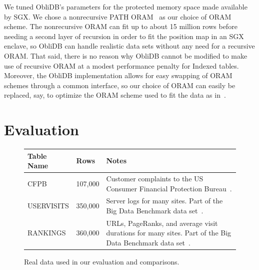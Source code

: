 \documentclass[letterpaper,twocolumn,10pt]{article}
\def\name/{ObliDB}
\begin{document}
We tuned ObliDB's parameters for the protected memory space made available by SGX. We chose a nonrecursive PATH ORAM~\cite{SDS+13} as our choice of ORAM scheme. The nonrecursive ORAM can fit up to about 15 million rows before needing a second layer of recursion in order to fit the position map in an SGX enclave, so \name/ can handle realistic data sets without any need for a recursive ORAM. That said, there is no reason why \name/ cannot be modified to make use of recursive ORAM at a modest performance penalty for Indexed tables. Moreover, the \name/ implementation allows for easy swapping of ORAM schemes through a common interface, so our choice of ORAM can easily be replaced, say, to optimize the ORAM scheme used to fit the data as in~\cite{ZWR+16}.

\section{Evaluation}\label{eval}
\begin{figure}
\small
\centering
\begin{tabular}{llp{3.5cm}}
\textbf{Table Name} & \textbf{Rows} & \textbf{Notes} \\\hline\rule{0pt}{2ex}
CFPB & 107,000 & Customer complaints to the US Consumer Financial Protection Bureau~\cite{CFPB}.\\
USERVISITS & 350,000 & Server logs for many sites. Part of the Big Data Benchmark data set~\cite{BDB}.\\
RANKINGS & 360,000 & URLs, PageRanks, and average visit durations for many sites. Part of the Big Data Benchmark data set~\cite{BDB}.\\
\end{tabular}
\caption{\small Real data used in our evaluation and comparisons.}
\label{tabletable}
\end{figure}
\end{document}
